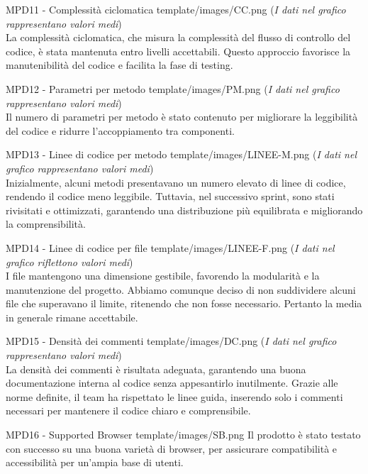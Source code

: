 \MetNoPB
{ %
    MPD11 - Complessità ciclomatica 
}
{ %
    template/images/CC.png
}
{   %
    (\textit{I dati nel grafico rappresentano valori medi})\\ La complessità ciclomatica, che misura la complessità del flusso di controllo del codice, è stata mantenuta entro livelli accettabili. Questo approccio favorisce la manutenibilità del codice e facilita la fase di testing.
}

\MetNoPB
{ %
    MPD12 - Parametri per metodo
}
{ %
    template/images/PM.png
}
{   %
    (\textit{I dati nel grafico rappresentano valori medi})\\ Il numero di parametri per metodo è stato contenuto per migliorare la leggibilità del codice e ridurre l'accoppiamento tra componenti.
}

\MetNoPB
{ %
    MPD13 - Linee di codice per metodo
}
{ %
    template/images/LINEE-M.png
}
{   %
    (\textit{I dati nel grafico rappresentano valori medi})\\ Inizialmente, alcuni metodi presentavano un numero elevato di linee di codice, rendendo il codice meno leggibile. Tuttavia, nel successivo sprint, sono stati rivisitati e ottimizzati, garantendo una distribuzione più equilibrata e migliorando la comprensibilità.
}

\MetNoPB
{ %
    MPD14 - Linee di codice per file
}
{ %
    template/images/LINEE-F.png
}
{   %
    (\textit{I dati nel grafico riflettono valori medi})\\ I file mantengono una dimensione gestibile, favorendo la modularità e la manutenzione del progetto. Abbiamo comunque deciso di non suddividere alcuni file che superavano il limite, ritenendo che non fosse necessario. Pertanto la media in generale rimane accettabile.
}


\MetNoPB
{ %
    MPD15 - Densità dei commenti
}
{ %
    template/images/DC.png
}
{   %
    (\textit{I dati nel grafico rappresentano valori medi})\\ La densità dei commenti è risultata adeguata, garantendo una buona documentazione interna al codice senza appesantirlo inutilmente. Grazie alle norme definite, il team ha rispettato le linee guida, inserendo solo i commenti necessari per mantenere il codice chiaro e comprensibile.
}


\MetNoPB
{ %
    MPD16 -  Supported Browser
}
{ %
    template/images/SB.png
}
{   %
    Il prodotto è stato testato con successo su una buona varietà di browser, per assicurare compatibilità e accessibilità per un’ampia base di utenti.
}
